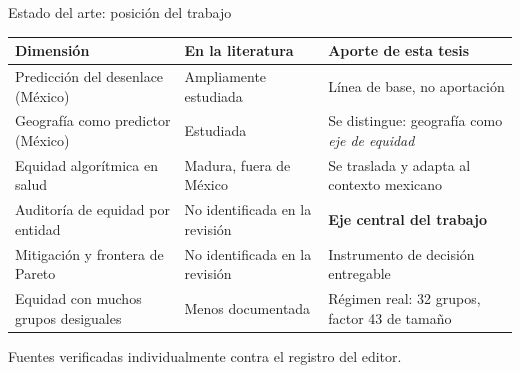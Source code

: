 \documentclass[aspectratio=169,11pt]{beamer}
\begin{document}
\begin{frame}{Estado del arte: posición del trabajo}
  \vspace{0.4em}
  \centering
  \renewcommand{\arraystretch}{1.22}
  {\footnotesize
  \begin{tabular}{p{4.6cm} p{3.5cm} p{4.6cm}}
    \toprule
    \textbf{Dimensión} & \textbf{En la literatura} & \textbf{Aporte de esta tesis}\\
    \midrule
    Predicción del desenlace (México) & Ampliamente estudiada &
      Línea de base, no aportación\\
    Geografía como predictor (México) & Estudiada &
      Se distingue: geografía como \textit{eje de equidad}\\
    Equidad algorítmica en salud & Madura, fuera de México &
      Se traslada y adapta al contexto mexicano\\
    \rowcolor{clarito} Auditoría de equidad por entidad & No identificada en la revisión &
      \textbf{Eje central del trabajo}\\
    \rowcolor{clarito} Mitigación y frontera de Pareto & No identificada en la revisión &
      Instrumento de decisión entregable\\
    Equidad con muchos grupos desiguales & Menos documentada &
      Régimen real: 32 grupos, factor 43 de tamaño\\
    \bottomrule
  \end{tabular}}

  \vspace{0.9em}
  {\footnotesize\color{humo} Fuentes verificadas individualmente contra el
  registro del editor.}
\end{frame}
\end{document}
